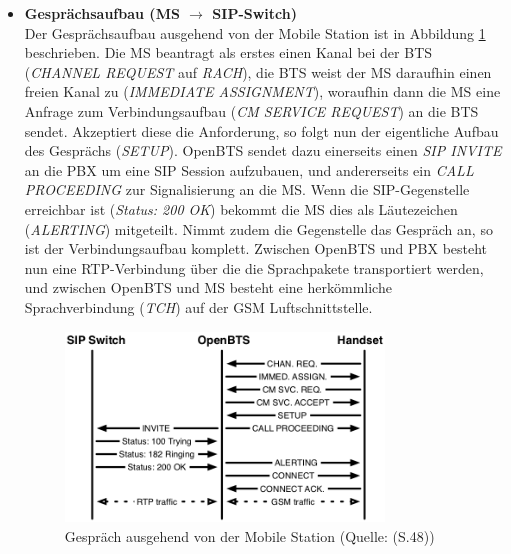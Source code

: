 \begin{itemize}
\item \textbf{Gesprächsaufbau (MS $\rightarrow$ SIP-Switch)}\\
Der Gesprächsaufbau ausgehend von der Mobile Station ist in Abbildung \ref{fig:openbts_call_msside} beschrieben. Die MS beantragt als erstes einen Kanal bei der BTS (\textit{CHANNEL REQUEST} auf \textit{RACH}), die BTS weist der MS daraufhin einen freien Kanal zu (\textit{IMMEDIATE ASSIGNMENT}), woraufhin dann die MS eine Anfrage zum Verbindungsaufbau (\textit{CM SERVICE REQUEST}) an die BTS sendet. Akzeptiert diese die Anforderung, so folgt nun der eigentliche Aufbau des Gesprächs (\textit{SETUP}). OpenBTS sendet dazu einerseits einen \textit{SIP INVITE} an die PBX um eine SIP Session aufzubauen, und andererseits ein \textit{CALL PROCEEDING} zur Signalisierung an die MS. Wenn die SIP-Gegenstelle erreichbar ist (\textit{Status: 200 OK}) bekommt die MS dies als Läutezeichen (\textit{ALERTING}) mitgeteilt. Nimmt zudem die Gegenstelle das Gespräch an, so ist der Verbindungsaufbau komplett. Zwischen OpenBTS und PBX besteht nun eine RTP-Verbindung über die die Sprachpakete transportiert werden, und zwischen OpenBTS und MS besteht eine herkömmliche Sprachverbindung (\textit{TCH}) auf der GSM Luftschnittstelle.
\begin{figure}[h]
	\centering
		\includegraphics[width=0.80\textwidth]{img/openbts_call_msside.png}
	\caption{Gespräch ausgehend von der Mobile Station (Quelle: \cite{bib:openbtsmanual}(S.48))}
	\label{fig:openbts_call_msside}
\end{figure}
\end{itemize}
